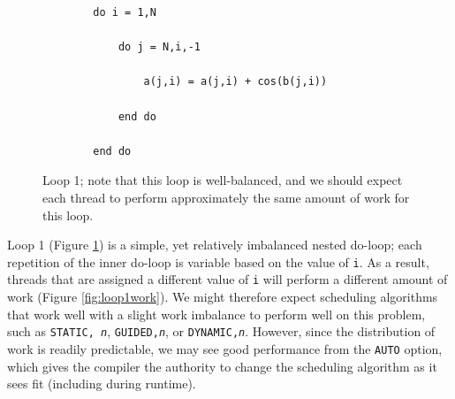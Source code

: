 \documentclass{article} %
\newcommand{\tp}{\texttt}
\begin{document}
\begin{figure}
    \begin{lstlisting}
        do i = 1,N

            do j = N,i,-1
        
                a(j,i) = a(j,i) + cos(b(j,i))
        
            end do
      
        end do
    \end{lstlisting}
    \caption{Loop 1; note that this loop is well-balanced, and we should expect each thread to perform approximately the same amount of work for this loop.}
    \label{listing:loop1}
\end{figure}

Loop 1 (Figure \ref{listing:loop1}) is a simple, yet relatively imbalanced nested do-loop; each repetition of the inner do-loop is variable based on the value of \texttt{i}.
As a result, threads that are assigned a different value of \tp{i} will perform a different amount of work (Figure \ref{fig:loop1work}).
We might therefore expect scheduling algorithms that work well with a slight work imbalance to perform well on this problem, such as \tp{STATIC, \textit{n}}, \tp{GUIDED,\textit{n}}, or \tp{DYNAMIC,\textit{n}}. However, since the distribution of work is readily predictable, we may see good performance from the \tp{AUTO} option, which gives the compiler the authority to change the scheduling algorithm as it sees fit (including during runtime).
\end{document}
